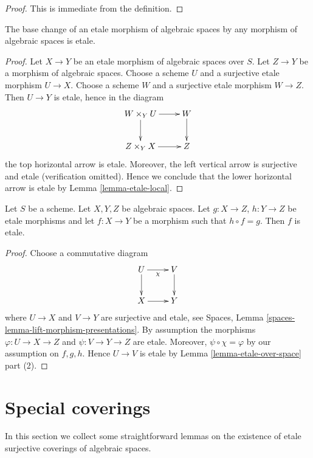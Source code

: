 \begin{proof}
This is immediate from the definition.
\end{proof}

\begin{lemma}
\label{lemma-base-change-etale}
The base change of an etale morphism of algebraic spaces
by any morphism of algebraic spaces is etale.
\end{lemma}

\begin{proof}
Let $X \to Y$ be an etale morphism of algebraic spaces over $S$.
Let $Z \to Y$ be a morphism of algebraic spaces.
Choose a scheme $U$ and a surjective etale morphism $U \to X$.
Choose a scheme $W$ and a surjective etale morphism $W \to Z$.
Then $U \to Y$ is etale, hence in the diagram
$$
\xymatrix{
W \times_Y U \ar[d] \ar[r] & W \ar[d] \\
Z \times_Y X \ar[r] & Z
}
$$
the top horizontal arrow is etale.
Moreover, the left vertical arrow is surjective
and etale (verification omitted). Hence we conclude that the lower
horizontal arrow is etale by Lemma \ref{lemma-etale-local}.
\end{proof}

\begin{lemma}
\label{lemma-etale-permanence}
Let $S$ be a scheme. Let $X, Y, Z$ be algebraic spaces.
Let $g : X \to Z$, $h : Y \to Z$ be etale morphisms and let
$f : X \to Y$ be a morphism such that $h \circ f = g$.
Then $f$ is etale.
\end{lemma}

\begin{proof}
Choose a commutative diagram
$$
\xymatrix{
U \ar[d] \ar[r]_\chi & V \ar[d] \\
X \ar[r] & Y
}
$$
where $U \to X$ and $V \to Y$ are surjective and etale, see
Spaces, Lemma \ref{spaces-lemma-lift-morphism-presentations}.
By assumption the morphisms $\varphi : U \to X \to Z$ and
$\psi : V \to Y \to Z$ are etale. Moreover, $\psi \circ \chi = \varphi$
by our assumption on $f, g, h$.
Hence $U \to V$ is etale by Lemma \ref{lemma-etale-over-space}
part (2).
\end{proof}


\section{Special coverings}
\label{section-special-coverings}

\noindent
In this section we collect some straightforward lemmas on the existence
of etale surjective coverings of algebraic spaces.

